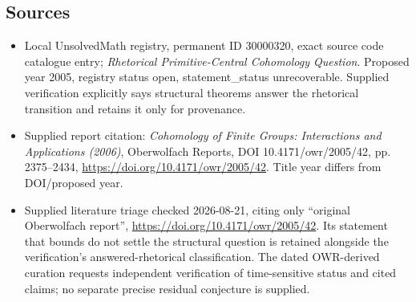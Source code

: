 \documentclass[11pt]{article}
\begin{document}
\subsection{Sources}
\begin{itemize}
\item Local UnsolvedMath registry, permanent ID 30000320, exact source code catalogue entry; \emph{Rhetorical Primitive-Central Cohomology Question}. Proposed year 2005, registry status open, statement\_status unrecoverable. Supplied verification explicitly says structural theorems answer the rhetorical transition and retains it only for provenance.
\item Supplied report citation: \emph{Cohomology of Finite Groups: Interactions and Applications (2006)}, Oberwolfach Reports, DOI 10.4171/owr/2005/42, pp. 2375--2434, \url{https://doi.org/10.4171/owr/2005/42}. Title year differs from DOI/proposed year.
\item Supplied literature triage checked 2026-08-21, citing only ``original Oberwolfach report'', \url{https://doi.org/10.4171/owr/2005/42}. Its statement that bounds do not settle the structural question is retained alongside the verification's answered-rhetorical classification. The dated OWR-derived curation requests independent verification of time-sensitive status and cited claims; no separate precise residual conjecture is supplied.
\end{itemize}
\end{document}

